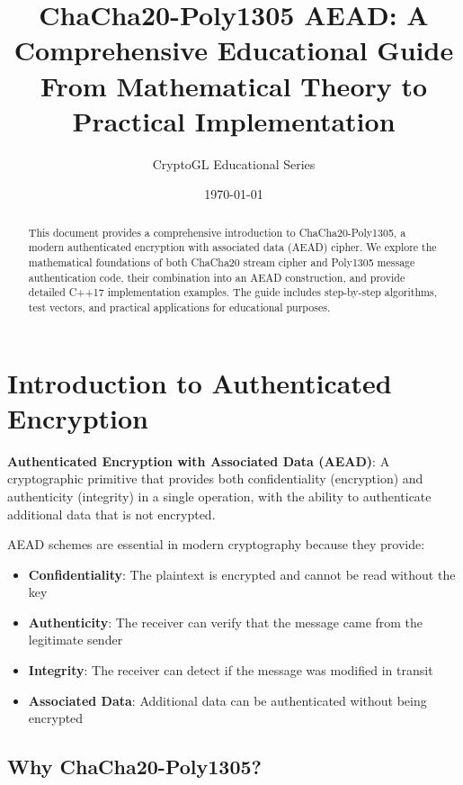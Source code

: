 \documentclass[11pt,a4paper]{article}
\title{\Huge\textbf{ChaCha20-Poly1305 AEAD: A Comprehensive Educational Guide}\\[0.5cm]
\large From Mathematical Theory to Practical Implementation}
\author{CryptoGL Educational Series}
\date{\today}
\begin{document}
\maketitle

\begin{abstract}
This document provides a comprehensive introduction to ChaCha20-Poly1305, a modern authenticated encryption with associated data (AEAD) cipher. We explore the mathematical foundations of both ChaCha20 stream cipher and Poly1305 message authentication code, their combination into an AEAD construction, and provide detailed C++17 implementation examples. The guide includes step-by-step algorithms, test vectors, and practical applications for educational purposes.
\end{abstract}

\tableofcontents
\newpage

\section{Introduction to Authenticated Encryption}

\begin{definitionbox}
\textbf{Authenticated Encryption with Associated Data (AEAD)}: A cryptographic primitive that provides both confidentiality (encryption) and authenticity (integrity) in a single operation, with the ability to authenticate additional data that is not encrypted.
\end{definitionbox}

AEAD schemes are essential in modern cryptography because they provide:
\begin{itemize}
    \item \textbf{Confidentiality}: The plaintext is encrypted and cannot be read without the key
    \item \textbf{Authenticity}: The receiver can verify that the message came from the legitimate sender
    \item \textbf{Integrity}: The receiver can detect if the message was modified in transit
    \item \textbf{Associated Data}: Additional data can be authenticated without being encrypted
\end{itemize}

\subsection{Why ChaCha20-Poly1305?}
\end{document}
